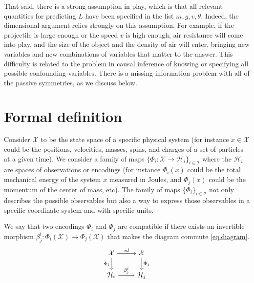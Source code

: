 \documentclass{article}
\theoremstyle{plain}
\theoremstyle{definition}
\theoremstyle{remark}
\begin{document}
That said, there is a strong assumption in play, which is that all relevant quantities for predicting $L$ have been specified in the list $m, g, v, \theta$.
Indeed, the dimensional argument relies strongly on this assumption.
For example, if the projectile is large enough or the speed $v$ is high enough, air resistance will come into play, and the size of the object and the density of air will enter, bringing new variables and new combinations of variables that matter to the answer.
This difficulty is related to the problem in causal inference of knowing or specifying all possible confounding variables.
There is a missing-information problem with all of the passive symmetries, as we discuss below.

\section{Formal definition}\label{sec:definitions}

Consider $\mathcal X$ to be the state space of a specific physical system (for instance $x\in \mathcal X$ could be the positions, velocities, masses, spins, and charges of a set of particles at a given time). 
We consider a family of maps $\{\Phi_i: \mathcal X \to \mathcal H_i\}_{i\in \mathcal I}$ where the $\mathcal H_i$ are spaces of observations or encodings (for instance $\Phi_i(x)$ could be the total mechanical energy of the system $x$ measured in Joules, and $\Phi_j(x)$ could be the momentum of the center of mass, etc).
The family of maps $\{\Phi_i\}_{i\in \mathcal I}$ not only describes the possible observables but also a way to express those observables in a specific coordinate system and with specific units. 

We say that two encodings $\Phi_i$ and $\Phi_j$ are compatible if there exists an invertible morphism $\beta_{j}^i:\Phi_i(\mathcal X)\to  \Phi_j(\mathcal X)$ that makes the diagram commute \eqref{eq.diagram}.
\begin{equation}\label{eq.diagram}
\begin{tikzcd}[]
  {\cal X}\arrow[r,"id"] \arrow[d,"\Phi_i",swap] & {\cal X}  \arrow[d,"\Phi_j"]\\
{\mathcal H_i} \arrow[r,"\beta_{j}^i"]  & {\mathcal H_j} 
\end{tikzcd}
\end{equation}

\end{document}
